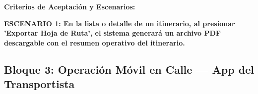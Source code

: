 \documentclass[a4paper,9pt]{article}
\begin{document}
\begin{tcolorbox}[hucard, title={\textbf{HU-61: EXPORTAR HOJA DE RUTA / ITINERARIO} \hfill \scriptsize \colorbox{redstatus}{\textbf{\ Rejected\ }} \quad \colorbox{white}{\textcolor{primarydark}{\textbf{\ 3 pts\ }}}}]
\noindent\textbf{\footnotesize Criterios de Aceptación y Escenarios:}\par\vspace{2pt}
{\footnotesize
\noindent\textbf{\textcolor{secondarydark}{ESCENARIO 1:  En la lista o detalle de un itinerario, al presionar 'Exportar Hoja de Ruta', el sistema generará un archivo PDF descargable con el resumen operativo del itinerario.}}\par\vspace{1pt}
}\par
\end{tcolorbox}

\subsection{Bloque 3: Operación Móvil en Calle — App del Transportista}
\end{document}
